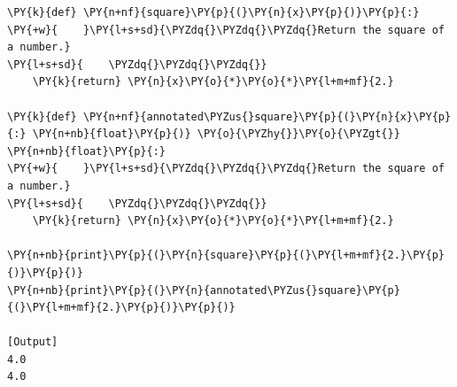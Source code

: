 \begin{Verbatim}[label=\makebox{\url{https://github.com/lucabaldini/cmepda/tree/master/slides/latex/snippets/type\_annotation.py}},commandchars=\\\{\}]
\PY{k}{def} \PY{n+nf}{square}\PY{p}{(}\PY{n}{x}\PY{p}{)}\PY{p}{:}
\PY{+w}{    }\PY{l+s+sd}{\PYZdq{}\PYZdq{}\PYZdq{}Return the square of a number.}
\PY{l+s+sd}{    \PYZdq{}\PYZdq{}\PYZdq{}}
    \PY{k}{return} \PY{n}{x}\PY{o}{*}\PY{o}{*}\PY{l+m+mf}{2.}

\PY{k}{def} \PY{n+nf}{annotated\PYZus{}square}\PY{p}{(}\PY{n}{x}\PY{p}{:} \PY{n+nb}{float}\PY{p}{)} \PY{o}{\PYZhy{}}\PY{o}{\PYZgt{}} \PY{n+nb}{float}\PY{p}{:}
\PY{+w}{    }\PY{l+s+sd}{\PYZdq{}\PYZdq{}\PYZdq{}Return the square of a number.}
\PY{l+s+sd}{    \PYZdq{}\PYZdq{}\PYZdq{}}
    \PY{k}{return} \PY{n}{x}\PY{o}{*}\PY{o}{*}\PY{l+m+mf}{2.}

\PY{n+nb}{print}\PY{p}{(}\PY{n}{square}\PY{p}{(}\PY{l+m+mf}{2.}\PY{p}{)}\PY{p}{)}
\PY{n+nb}{print}\PY{p}{(}\PY{n}{annotated\PYZus{}square}\PY{p}{(}\PY{l+m+mf}{2.}\PY{p}{)}\PY{p}{)}

[Output]
4.0
4.0
\end{Verbatim}